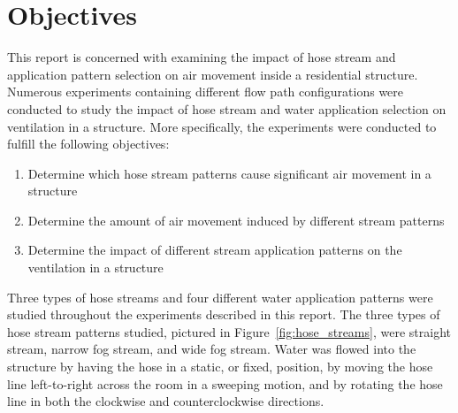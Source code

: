 \documentclass[12pt,oneside]{book}
\begin{document}
\section{Objectives}
\label{sec:objectives}
This report is concerned with examining the impact of hose stream and application pattern selection on air movement inside a residential structure. Numerous experiments containing different flow path configurations were conducted to study the impact of hose stream and water application selection on ventilation in a structure. More specifically, the experiments were conducted to fulfill the following objectives:
\begin{enumerate}
	\item Determine which hose stream patterns cause significant air movement in a structure 
	\item Determine the amount of air movement induced by different stream patterns
	\item Determine the impact of different stream application patterns on the ventilation in a structure
\end{enumerate}

Three types of hose streams and four different water application patterns were studied throughout the experiments described in this report. The three types of hose stream patterns studied, pictured in Figure~\ref{fig:hose_streams}, were straight stream, narrow fog stream, and wide fog stream. Water was flowed into the structure by having the hose in a static, or fixed, position, by moving the hose line left-to-right across the room in a sweeping motion, and by rotating the hose line in both the clockwise and counterclockwise directions.

\end{document}
